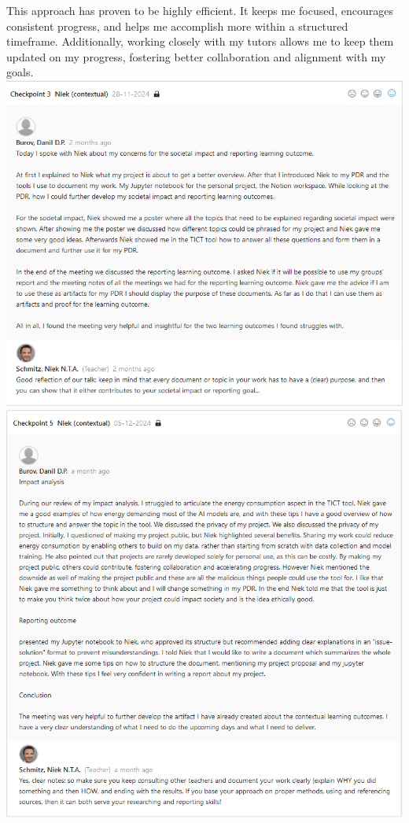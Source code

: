 \documentclass{article}
\begin{document}
This approach has proven to be highly efficient. It keeps me focused, encourages consistent progress, and helps me accomplish more within a structured timeframe. Additionally, working closely with my tutors allows me to keep them updated on my progress, fostering better collaboration and alignment with my goals.\\
\includegraphics[width=\textwidth,keepaspectratio]{images/Feedback_Niek_1.png}\\
\includegraphics[width=\textwidth,keepaspectratio]{images/Feedback_Niek_2.png}\\
\end{document}
